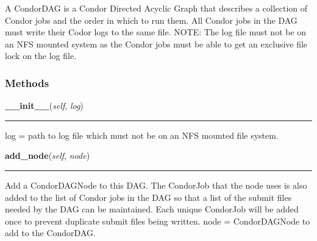     \label{pipeline:CondorDAG}
A CondorDAG is a Condor Directed Acyclic Graph that describes a 
collection of Condor jobs and the order in which to run them. All Condor 
jobs in the DAG must write their Codor logs to the same file. NOTE: The 
log file must not be on an NFS mounted system as the Condor jobs must be 
able to get an exclusive file lock on the log file.



  \subsubsection{Methods}

    \label{pipeline:CondorDAG:__init__}
    \vspace{0.5ex}

    \noindent\begin{boxedminipage}{\textwidth}

    \raggedright \textbf{\_\_init\_\_}(\textit{self}, \textit{log})

    \vspace{-1.5ex}

    \rule{\textwidth}{0.5\fboxrule}
    log = path to log file which must not be on an NFS mounted file 
    system.

    \vspace{1ex}

    \end{boxedminipage}

    \label{pipeline:CondorDAG:add_node}
    \vspace{0.5ex}

    \noindent\begin{boxedminipage}{\textwidth}

    \raggedright \textbf{add\_node}(\textit{self}, \textit{node})

    \vspace{-1.5ex}

    \rule{\textwidth}{0.5\fboxrule}
    Add a CondorDAGNode to this DAG. The CondorJob that the node uses is 
    also added to the list of Condor jobs in the DAG so that a list of 
    the submit files needed by the DAG can be maintained. Each unique 
    CondorJob will be added once to prevent duplicate submit files being 
    written. node = CondorDAGNode to add to the CondorDAG.

    \vspace{1ex}

    \end{boxedminipage}

